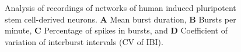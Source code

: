 \documentclass[12pt, titlepage]{article}
\begin{document}
		\begin{figure}[h]
			\centering
			\caption{Analysis of recordings of networks of human induced pluripotent stem cell-derived neurons. \textbf{A} Mean burst duration, \textbf{B} Bursts per minute, \textbf{C} Percentage of spikes in bursts, and \textbf{D} Coefficient of variation of interburst intervals (CV of IBI).}
			\label{hiPSN_results}
		\end{figure}
\end{document}
